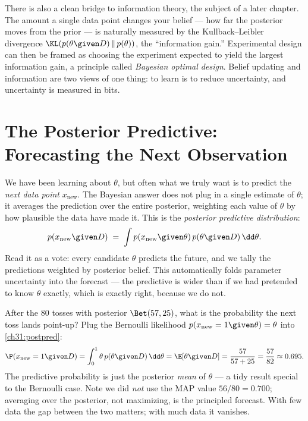\begin{connectionbox}
There is also a clean bridge to information theory, the subject of a later chapter. The
amount a single data point changes your belief --- how far the posterior moves from the
prior --- is naturally measured by the Kullback--Leibler divergence $\KL(p(\theta\given
D)\,\|\,p(\theta))$, the ``information gain.'' Experimental design can then be framed as
choosing the experiment expected to yield the largest information gain, a principle called
\emph{Bayesian optimal design}. Belief updating and information are two views of one thing:
to learn is to reduce uncertainty, and uncertainty is measured in bits.
\end{connectionbox}

\section{The Posterior Predictive: Forecasting the Next Observation}
\label{ch31:predictive}

We have been learning about $\theta$, but often what we truly want is to predict the
\emph{next data point} $x_{\text{new}}$. The Bayesian answer does not plug in a single
estimate of $\theta$; it averages the prediction over the entire posterior, weighting each
value of $\theta$ by how plausible the data have made it. This is the \emph{posterior
predictive distribution}:
\begin{equation}
  p(x_{\text{new}}\given D) \;=\; \int p(x_{\text{new}}\given\theta)\,
       p(\theta\given D)\,\dd\theta.
  \label{ch31:postpred}
\end{equation}
Read it as a vote: every candidate $\theta$ predicts the future, and we tally the
predictions weighted by posterior belief. This automatically folds parameter uncertainty
into the forecast --- the predictive is wider than if we had pretended to know $\theta$
exactly, which is exactly right, because we do not.

\begin{example}
\label{ch31:ex-postpred}
After the $80$ tosses with posterior $\Bet(57,25)$, what is the probability the next toss
lands point-up? Plug the Bernoulli likelihood $p(x_{\text{new}}=1\given\theta)=\theta$ into
\eqref{ch31:postpred}:
\[
  \P(x_{\text{new}}=1\given D) = \int_0^1 \theta\,p(\theta\given D)\,\dd\theta
  = \E[\theta\given D] = \frac{57}{57+25} = \frac{57}{82}\approx 0.695.
\]
The predictive probability is just the posterior \emph{mean} of $\theta$ --- a tidy result
special to the Bernoulli case. Note we did \emph{not} use the MAP value $56/80 = 0.700$;
averaging over the posterior, not maximizing, is the principled forecast. With few data the
gap between the two matters; with much data it vanishes.
\end{example}

